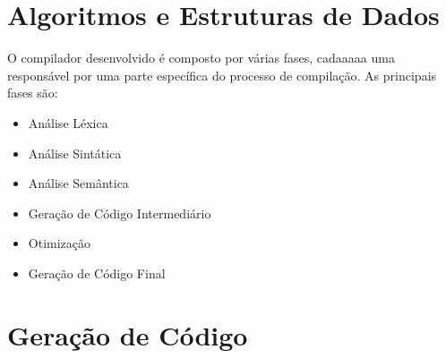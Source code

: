 \documentclass[12pt]{article}
\begin{document}
\section{Algoritmos e Estruturas de Dados}
O compilador desenvolvido é composto por várias fases, cadaaaaa uma responsável por uma parte específica do processo de compilação. As principais fases são:

\begin{itemize}
    \item Análise Léxica
    \item Análise Sintática
    \item Análise Semântica
    \item Geração de Código Intermediário
    \item Otimização
    \item Geração de Código Final
\end{itemize}

\section{Geração de Código}
\end{document}
